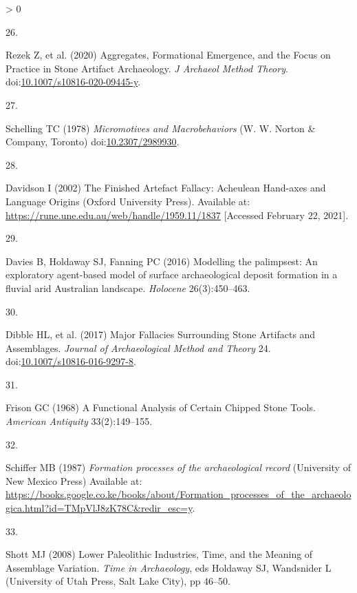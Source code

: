 \documentclass[9pt,twocolumn,twoside,]{pnas-new}
\newlength{\csllabelwidth}
\newlength{\cslhangindent}
\newenvironment{CSLReferences}[3] %
 {%
  \setlength{\parindent}{0pt}
  \ifodd #1 \everypar{\setlength{\hangindent}{\cslhangindent}}\ignorespaces\fi
  \ifnum #2 > 0
  \setlength{\parskip}{#2\baselineskip}
  \fi
 }%
 {}
\newcommand{\CSLLeftMargin}[1]{\parbox[t]{\csllabelwidth}{#1}}
\newcommand{\CSLRightInline}[1]{\parbox[t]{\linewidth - \csllabelwidth}{#1}}
\begin{document}
\begin{CSLReferences}{0}{0}
\leavevmode\hypertarget{ref-rezekAggregatesFormationalEmergence2020}{}%
\CSLLeftMargin{26. }
\CSLRightInline{Rezek Z, et al. (2020) Aggregates, {Formational
Emergence}, and the {Focus} on {Practice} in {Stone Artifact
Archaeology}. \emph{J Archaeol Method Theory}.
doi:\href{https://doi.org/10.1007/s10816-020-09445-y}{10.1007/s10816-020-09445-y}.}

\leavevmode\hypertarget{ref-schellingMicromotivesMacrobehaviors1978}{}%
\CSLLeftMargin{27. }
\CSLRightInline{Schelling TC (1978) \emph{Micromotives and
{Macrobehaviors}} ({W. W. Norton \& Company}, {Toronto})
doi:\href{https://doi.org/10.2307/2989930}{10.2307/2989930}.}

\leavevmode\hypertarget{ref-davidsonFinishedArtefactFallacy2002}{}%
\CSLLeftMargin{28. }
\CSLRightInline{Davidson I (2002) The {Finished Artefact Fallacy}:
{Acheulean Hand}-axes and {Language Origins} ({Oxford University
Press}). Available at:
\url{https://rune.une.edu.au/web/handle/1959.11/1837} {[}Accessed
February 22, 2021{]}.}

\leavevmode\hypertarget{ref-daviesModellingPalimpsestExploratory2016}{}%
\CSLLeftMargin{29. }
\CSLRightInline{Davies B, Holdaway SJ, Fanning PC (2016) Modelling the
palimpsest: {An} exploratory agent-based model of surface archaeological
deposit formation in a fluvial arid {Australian} landscape.
\emph{Holocene} 26(3):450--463.}

\leavevmode\hypertarget{ref-dibbleMajorFallaciesSurrounding2017}{}%
\CSLLeftMargin{30. }
\CSLRightInline{Dibble HL, et al. (2017) Major {Fallacies Surrounding
Stone Artifacts} and {Assemblages}. \emph{Journal of Archaeological
Method and Theory} 24.
doi:\href{https://doi.org/10.1007/s10816-016-9297-8}{10.1007/s10816-016-9297-8}.}

\leavevmode\hypertarget{ref-frisonFunctionalAnalysisCertain1968}{}%
\CSLLeftMargin{31. }
\CSLRightInline{Frison GC (1968) A {Functional Analysis} of {Certain
Chipped Stone Tools}. \emph{American Antiquity} 33(2):149--155.}

\leavevmode\hypertarget{ref-schifferFormationProcessesArchaeological1987}{}%
\CSLLeftMargin{32. }
\CSLRightInline{Schiffer MB (1987) \emph{Formation processes of the
archaeological record} ({University of New Mexico Press}) Available at:
\url{https://books.google.co.ke/books/about/Formation_processes_of_the_archaeologica.html?id=TMpVlJ8zK78C\&redir_esc=y}.}

\leavevmode\hypertarget{ref-shottLowerPaleolithicIndustries2008}{}%
\CSLLeftMargin{33. }
\CSLRightInline{Shott MJ (2008) Lower {Paleolithic Industries}, {Time},
and the {Meaning} of {Assemblage Variation}. \emph{Time in
{Archaeology}}, eds Holdaway SJ, Wandsnider L ({University of Utah
Press}, {Salt Lake City}), pp 46--50.}


\end{CSLReferences}
\end{document}
